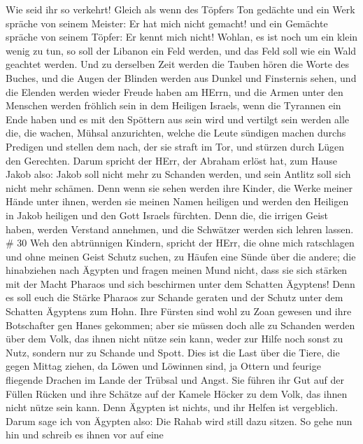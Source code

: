  Wie seid ihr so verkehrt! Gleich als wenn des Töpfers Ton
gedächte und ein Werk spräche von seinem Meister: Er hat mich nicht
gemacht! und ein Gemächte spräche von seinem Töpfer: Er kennt mich
nicht!  Wohlan, es ist noch um ein klein wenig zu tun, so
soll der Libanon ein Feld werden, und das Feld soll wie ein Wald
geachtet werden.  Und zu derselben Zeit werden die Tauben
hören die Worte des Buches, und die Augen der Blinden werden aus Dunkel
und Finsternis sehen,  und die Elenden werden wieder Freude
haben am HErrn, und die Armen unter den Menschen werden fröhlich sein in
dem Heiligen Israels,  wenn die Tyrannen ein Ende haben und
es mit den Spöttern aus sein wird und vertilgt sein werden alle die, die
wachen, Mühsal anzurichten,  welche die Leute sündigen
machen durchs Predigen und stellen dem nach, der sie straft im Tor, und
stürzen durch Lügen den Gerechten.  Darum spricht der HErr,
der Abraham erlöst hat, zum Hause Jakob also: Jakob soll nicht mehr zu
Schanden werden, und sein Antlitz soll sich nicht mehr schämen.
 Denn wenn sie sehen werden ihre Kinder, die Werke meiner
Hände unter ihnen, werden sie meinen Namen heiligen und werden den
Heiligen in Jakob heiligen und den Gott Israels fürchten. 
Denn die, die irrigen Geist haben, werden Verstand annehmen, und die
Schwätzer werden sich lehren lassen. \# 30  Weh den
abtrünnigen Kindern, spricht der HErr, die ohne mich ratschlagen und
ohne meinen Geist Schutz suchen, zu Häufen eine Sünde über die andere;
 die hinabziehen nach Ägypten und fragen meinen Mund nicht,
dass sie sich stärken mit der Macht Pharaos und sich beschirmen unter
dem Schatten Ägyptens!  Denn es soll euch die Stärke Pharaos
zur Schande geraten und der Schutz unter dem Schatten Ägyptens zum Hohn.
 Ihre Fürsten sind wohl zu Zoan gewesen und ihre Botschafter
gen Hanes gekommen;  aber sie müssen doch alle zu Schanden
werden über dem Volk, das ihnen nicht nütze sein kann, weder zur Hilfe
noch sonst zu Nutz, sondern nur zu Schande und Spott.  Dies
ist die Last über die Tiere, die gegen Mittag ziehen, da Löwen und
Löwinnen sind, ja Ottern und feurige fliegende Drachen im Lande der
Trübsal und Angst. Sie führen ihr Gut auf der Füllen Rücken und ihre
Schätze auf der Kamele Höcker zu dem Volk, das ihnen nicht nütze sein
kann.  Denn Ägypten ist nichts, und ihr Helfen ist
vergeblich. Darum sage ich von Ägypten also: Die Rahab wird still dazu
sitzen.  So gehe nun hin und schreib es ihnen vor auf eine
